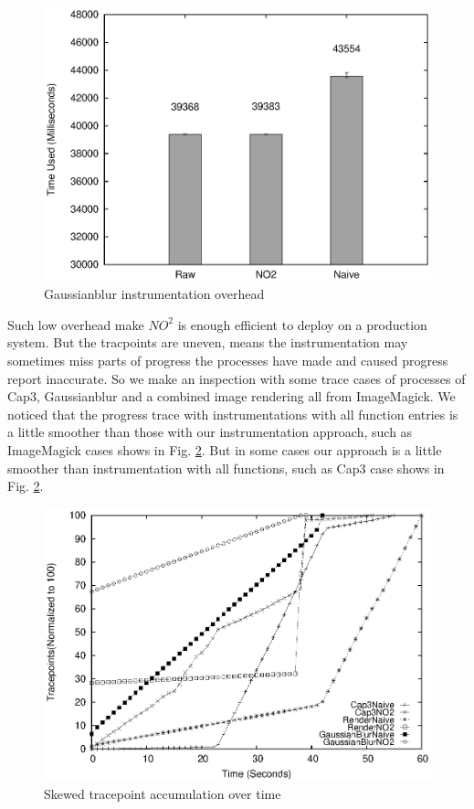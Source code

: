 \begin{figure}
\centering
  \includegraphics[width=0.9\columnwidth]{figures/overhead_gaussianblur.eps}
\caption{Gaussianblur instrumentation overhead}
\label{figure:overhead_gaussianblur}
\end{figure}

Such low overhead make $NO^2$ is enough efficient to deploy on a production system. But
the tracpoints are uneven, means the instrumentation may sometimes miss parts of progress
the processes have made and caused progress report inaccurate. So we make an inspection
with some trace cases of processes of Cap3, Gaussianblur and a combined image rendering
all from ImageMagick. We noticed that the progress trace with instrumentations with all
function entries is a little smoother than those with our instrumentation approach, such
as ImageMagick cases shows in Fig. \ref{figure:tracepoints}. But in some cases our
approach is a little smoother than instrumentation with all functions, such as Cap3 case
shows in Fig. \ref{figure:tracepoints}.

\begin{figure}
\centering
\includegraphics[width=0.9\columnwidth]{figures/tracepoints_all_vs_sampling.eps}
\caption{Skewed tracepoint accumulation over time}
\label{figure:tracepoints}
\end{figure}

